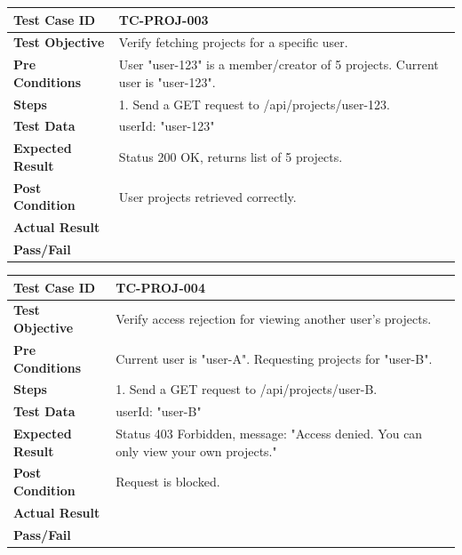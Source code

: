 \begin{longtable}{|p{}|p{}|}
\hline
\textbf{Test Case ID} & TC-PROJ-003 \\ \hline
\textbf{Test Objective} & Verify fetching projects for a specific user. \\ \hline
\textbf{Pre Conditions} & User "user-123" is a member/creator of 5 projects. Current user is "user-123". \\ \hline
\textbf{Steps} & 
1. Send a GET request to /api/projects/user-123. \\ \hline
\textbf{Test Data} & userId: "user-123" \\ \hline
\textbf{Expected Result} & Status 200 OK, returns list of 5 projects. \\ \hline
\textbf{Post Condition} & User projects retrieved correctly. \\ \hline
\textbf{Actual Result} &  \\ \hline
\textbf{Pass/Fail} &  \\ \hline
\end{longtable}

\begin{longtable}{|p{}|p{}|}
\hline
\textbf{Test Case ID} & TC-PROJ-004 \\ \hline
\textbf{Test Objective} & Verify access rejection for viewing another user's projects. \\ \hline
\textbf{Pre Conditions} & Current user is "user-A". Requesting projects for "user-B". \\ \hline
\textbf{Steps} & 
1. Send a GET request to /api/projects/user-B. \\ \hline
\textbf{Test Data} & userId: "user-B" \\ \hline
\textbf{Expected Result} & Status 403 Forbidden, message: "Access denied. You can only view your own projects." \\ \hline
\textbf{Post Condition} & Request is blocked. \\ \hline
\textbf{Actual Result} &  \\ \hline
\textbf{Pass/Fail} &  \\ \hline
\end{longtable}

